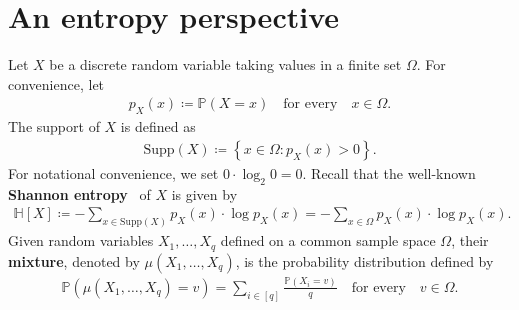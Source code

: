 \documentclass[11pt,a4paper]{article}
\begin{document}
\section{An entropy perspective}\label{SEC:Entropy}
%
%
Let $X$ be a discrete random variable taking values in a finite set $\Omega$. For convenience, let 
\begin{align*}
    p_{X}(x) \coloneqq \mathbb{P}(X = x)
    \quad\text{for every}\quad x \in \Omega. 
\end{align*}
%
The support of $X$ is defined as
\begin{align*}
    \mathrm{Supp}(X)
    \coloneqq \left\{x\in \Omega \colon p_{X}(x) > 0\right\}. 
\end{align*}
%
For notational convenience, we set $0 \cdot \log_{2}0 = 0$. 
Recall that the well-known \textbf{Shannon entropy}~\cite{Sha48} of $X$ is given by  
\begin{align*}
    \mathbb{H}[X]
    \coloneqq - \sum_{x \in \mathrm{Supp}(X)} p_{X}(x) \cdot \log p_{X}(x)
    = - \sum_{x \in \Omega} p_{X}(x) \cdot \log p_{X}(x). 
\end{align*}
%
Given random variables $X_1, \ldots, X_q$ defined on a common sample space $\Omega$, their \textbf{mixture}, denoted by $\mu(X_1, \ldots, X_q)$, is the probability distribution defined by
\begin{align*}
    \mathbb{P}\left( \mu(X_1, \ldots, X_q) = v \right)
    = \sum_{i\in [q]} \frac{\mathbb{P}\left(X_i = v\right)}{q}
    \quad\text{for every}\quad v\in \Omega. 
\end{align*}
%
\end{document}
